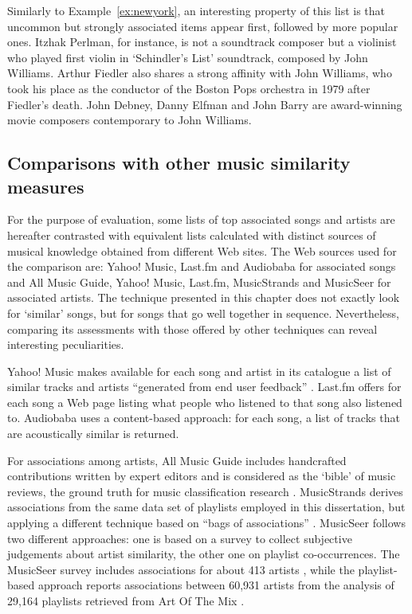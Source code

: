 Similarly to Example~\ref{ex:newyork}, an interesting property of this list is that uncommon but strongly associated items appear first, followed by more popular ones.
Itzhak Perlman, for instance, is not a soundtrack composer but a violinist who played first violin in `Schindler's List' soundtrack, composed by John Williams.
Arthur Fiedler also shares a strong affinity with John Williams, who took his place as the conductor of the Boston Pops orchestra in 1979 after Fiedler's death.
John Debney, Danny Elfman and John Barry are award-winning movie composers contemporary to John Williams.

\subsection{Comparisons with other music similarity measures} %
\label{sub:comparisons_with_music_similarity_measures}

For the purpose of evaluation, some lists of top associated songs and artists are hereafter contrasted with equivalent lists calculated with distinct sources of musical knowledge obtained from different Web sites.
The Web sources used for the comparison are: Yahoo! Music, Last.fm and Audiobaba for associated songs and All Music Guide, Yahoo! Music, Last.fm, MusicStrands and MusicSeer for associated artists.
The technique presented in this chapter does not exactly look for `similar' songs, but for songs that go well together in sequence.
Nevertheless, comparing its assessments with those offered by other techniques can reveal interesting peculiarities.

Yahoo! Music makes available for each song and artist in its catalogue a list of similar tracks and artists ``generated from end user feedback'' \cite{Baumann04}.
Last.fm offers for each song a Web page listing what people who listened to that song also listened to.
Audiobaba uses a content-based approach: for each song, a list of tracks that are acoustically similar is returned.

For associations among artists, All Music Guide includes handcrafted contributions written by expert editors and is considered as the `bible' of music reviews, the ground truth for music classification research \cite{Pachet00b,Hu07,Magno08,Sordo08}.
MusicStrands derives associations from the same data set of playlists employed in this dissertation, but applying a different technique based on ``bags of associations'' \cite{Shur06}.
MusicSeer follows two different approaches: one is based on a survey to collect subjective judgements about artist similarity, the other one on playlist co-occurrences. 
The MusicSeer survey includes associations for about 413 artists \cite{Logan03}, while the playlist-based approach reports associations between 60,931 artists from the analysis of 29,164 playlists retrieved from Art Of The Mix \cite{Ellis03}.

